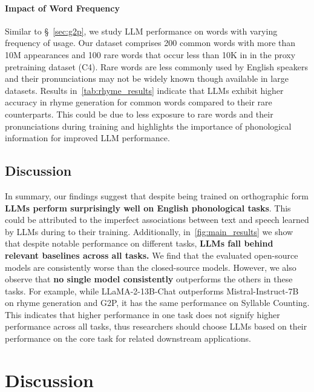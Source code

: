 \paragraph{Impact of Word Frequency} Similar to \S~\ref{sec:g2p}, we study LLM performance on words with varying frequency of usage. Our dataset comprises 200 common words with more than 10M appearances and 100 rare words that occur less than 10K in in the proxy pretraining dataset (C4). Rare words are less commonly used by English speakers and their pronunciations may not be widely known though available in large datasets. Results in~\autoref{tab:rhyme_results} indicate that LLMs exhibit higher accuracy in rhyme generation for common words compared to their rare counterparts. This could be due to less exposure to rare words and their pronunciations during training and highlights the importance of phonological information for improved LLM performance.

\label{sec:rhyme_results}

\subsection{Discussion}
In summary, our findings suggest that despite being trained on orthographic form \textbf{LLMs perform surprisingly well on English phonological tasks}. This could be attributed to the imperfect associations between text and speech learned by LLMs during to their training. Additionally, 
in~\autoref{fig:main_results} we show that despite notable performance on different tasks, \textbf{LLMs fall behind relevant baselines across all tasks.} We find that the evaluated open-source models are consistently worse than the closed-source models. However, we also observe that \textbf{no single model consistently} outperforms the others in these tasks. For example, while LLaMA-2-13B-Chat outperforms Mistral-Instruct-7B on rhyme generation and G2P, it has the same performance on Syllable Counting. This indicates that higher performance in one task does not signify higher performance across all tasks, thus researchers should choose LLMs based on their performance on the core task for related downstream applications. 

\section{Discussion}

